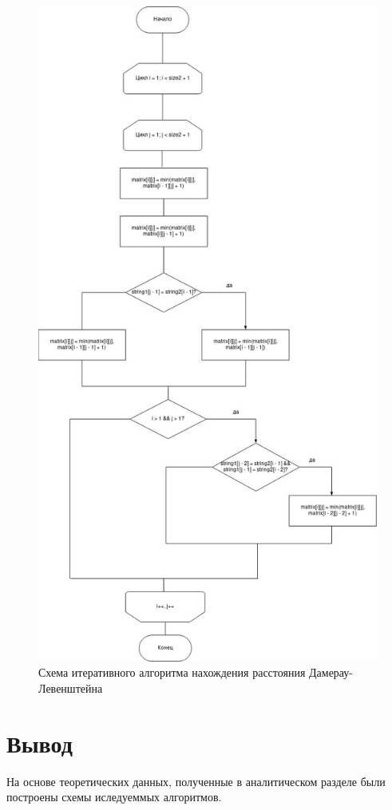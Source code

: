 \documentclass[12pt]{report}
\begin{document}
	\begin{figure}[h]
		\centering
		\includegraphics[scale=0.4]{iter_dl.jpg}
		\caption{Схема итеративного алгоритма нахождения расстояния Дамерау-Левенштейна}
		\label{fig:mpr}
	\end{figure}
	
	\section{Вывод}
	На основе теоретических данных, полученные в аналитическом разделе были построены схемы иследуеммых  алгоритмов.
	
\end{document}
